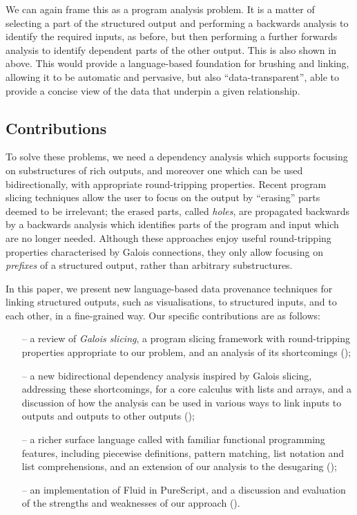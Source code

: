 We can again frame this as a program analysis problem. It is a matter of selecting a part of the structured output and performing a backwards analysis to identify the required inputs, as before, but then performing a further forwards analysis to identify dependent parts of the other output. This is also shown in  above. This would provide a language-based foundation for brushing and linking, allowing it to be automatic and pervasive, but also ``data-transparent'', able to provide a concise view of the data that underpin a given relationship.

\subsection{Contributions}

To solve these problems, we need a dependency analysis which supports focusing on substructures of rich outputs, and moreover one which can be used bidirectionally, with appropriate round-tripping properties. Recent program slicing techniques \cite{perera12a,perera13a,ricciotti17} allow the user to focus on the output by ``erasing'' parts deemed to be irrelevant; the erased parts, called \emph{holes}, are propagated backwards by a backwards analysis which identifies parts of the program and input which are no longer needed. Although these approaches enjoy useful round-tripping properties characterised by Galois connections, they only allow focusing on \emph{prefixes} of a structured output, rather than arbitrary substructures.

In this paper, we present new language-based data provenance techniques for linking structured outputs, such as visualisations, to structured inputs, and to each other, in a fine-grained way. Our specific contributions are as follows:

\begin{itemize}[leftmargin=*]
   \item[--] a review of \emph{Galois slicing}, a program slicing framework with round-tripping properties appropriate to our problem, and an analysis of its shortcomings ();
   \item[--] a new bidirectional dependency analysis inspired by Galois slicing, addressing these shortcomings, for a core calculus with lists and arrays, and a discussion of how the analysis can be used in various ways to link inputs to outputs and outputs to other outputs ();
   \item[--] a richer surface language called \OurLanguage with familiar functional programming features, including piecewise definitions, pattern matching, list notation and list comprehensions, and an extension of our analysis to the desugaring ();
   \item[--] an implementation of Fluid in PureScript, and a discussion and evaluation of the strengths and weaknesses of our approach ().
\end{itemize}
